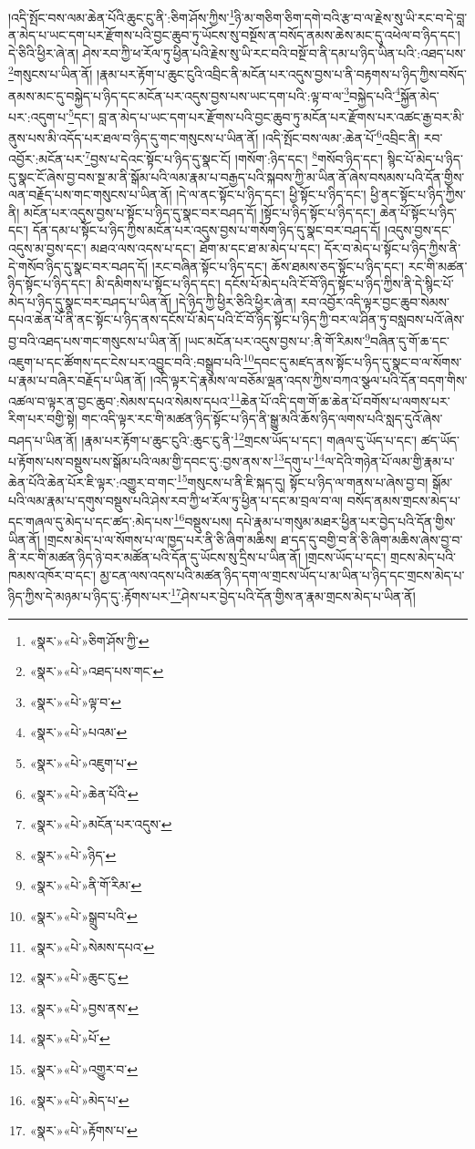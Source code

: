 །འདི་སྤོང་བས་ལམ་ཆེན་པོའི་ཆུང་ངུ་ནི་:ཅིག་ཤོས་ཀྱིས་\footnote{«སྣར་»«པེ་»ཅིག་ཤོས་ཀྱི་}ཉི་མ་གཅིག་ཅིག་དགེ་བའི་རྩ་བ་ལ་རྗེས་སུ་ཡི་རང་བ་དེ་བླ་ན་མེད་པ་ཡང་དག་པར་རྫོགས་པའི་བྱང་ཆུབ་ཏུ་ཡོངས་སུ་བསྔོས་ན་བསོད་ནམས་ཆེས་མང་དུ་འཕེལ་བ་ཉིད་དང་། དེ་ཅིའི་ཕྱིར་ཞེ་ན། ཤེས་རབ་ཀྱི་ཕ་རོལ་ཏུ་ཕྱིན་པའི་རྗེས་སུ་ཡི་རང་བའི་བསྔོ་བ་ནི་དམ་པ་ཉིད་ཡིན་པའི་:འཐད་པས་\footnote{«སྣར་»«པེ་»འཐད་པས་གང་}གསུངས་པ་ཡིན་ནོ། །རྣམ་པར་རྟོག་པ་ཆུང་ངུའི་འབྲིང་ནི་མངོན་པར་འདུས་བྱས་པ་ནི་བརྟགས་པ་ཉིད་ཀྱིས་བསོད་ནམས་མང་དུ་བསྐྱེད་པ་ཉིད་དང་མངོན་པར་འདུས་བྱས་པས་ཡང་དག་པའི་:ལྟ་བ་ལ་\footnote{«སྣར་»«པེ་»ལྟ་བ་}བསྐྱེད་པའི་\footnote{«སྣར་»«པེ་»པའམ་}སྐྱོན་མེད་པར་:འདུག་པ་\footnote{«སྣར་»«པེ་»འཇུག་པ་}དང་། བླ་ན་མེད་པ་ཡང་དག་པར་རྫོགས་པའི་བྱང་ཆུབ་ཏུ་མངོན་པར་རྫོགས་པར་འཚང་རྒྱ་བར་མི་ནུས་པས་མི་འདོད་པར་ཐལ་བ་ཉིད་དུ་གང་གསུངས་པ་ཡིན་ནོ། །འདི་སྤོང་བས་ལམ་:ཆེན་པོ་\footnote{«སྣར་»«པེ་»ཆེན་པོའི་}འབྲིང་ནི། རབ་འབྱོར་:མངོན་པར་\footnote{«སྣར་»«པེ་»མངོན་པར་འདུས་}བྱས་པ་དེའང་སྟོང་པ་ཉིད་དུ་སྣང་ངོ། །གསོག་:ཉིད་དང་། \footnote{«སྣར་»«པེ་»ཉིད་}གསོབ་ཉིད་དང་། སྙིང་པོ་མེད་པ་ཉིད་དུ་སྣང་ངོ་ཞེས་བྱ་བས་སྔ་མ་ནི་སྒོམ་པའི་ལམ་རྣམ་པ་བརྒྱད་པའི་སྐབས་ཀྱི་མ་ཡིན་ནོ་ཞེས་བསམས་པའི་དོན་གྱིས་ལན་བརྗོད་པས་གང་གསུངས་པ་ཡིན་ནོ། །དེ་ལ་ནང་སྟོང་པ་ཉིད་དང་། ཕྱི་སྟོང་པ་ཉིད་དང་། ཕྱི་ནང་སྟོང་པ་ཉིད་ཀྱིས་ནི། མངོན་པར་འདུས་བྱས་པ་སྟོང་པ་ཉིད་དུ་སྣང་བར་བཤད་དོ། །སྟོང་པ་ཉིད་སྟོང་པ་ཉིད་དང་། ཆེན་པོ་སྟོང་པ་ཉིད་དང་། དོན་དམ་པ་སྟོང་པ་ཉིད་ཀྱིས་མངོན་པར་འདུས་བྱས་པ་གསོག་ཉིད་དུ་སྣང་བར་བཤད་དོ། །འདུས་བྱས་དང་འདུས་མ་བྱས་དང་། མཐའ་ལས་འདས་པ་དང་། ཐོག་མ་དང་ཐ་མ་མེད་པ་དང་། དོར་བ་མེད་པ་སྟོང་པ་ཉིད་ཀྱིས་ནི་དེ་གསོབ་ཉིད་དུ་སྣང་བར་བཤད་དོ། །རང་བཞིན་སྟོང་པ་ཉིད་དང་། ཆོས་ཐམས་ཅད་སྟོང་པ་ཉིད་དང་། རང་གི་མཚན་ཉིད་སྟོང་པ་ཉིད་དང་། མི་དམིགས་པ་སྟོང་པ་ཉིད་དང་། དངོས་པོ་མེད་པའི་ངོ་བོ་ཉིད་སྟོང་པ་ཉིད་ཀྱིས་ནི་དེ་སྙིང་པོ་མེད་པ་ཉིད་དུ་སྣང་བར་བཤད་པ་ཡིན་ནོ། །དེ་ཉིད་ཀྱི་ཕྱིར་ཅིའི་ཕྱིར་ཞེ་ན། རབ་འབྱོར་འདི་ལྟར་བྱང་ཆུབ་སེམས་དཔའ་ཆེན་པོ་ནི་ནང་སྟོང་པ་ཉིད་ནས་དངོས་པོ་མེད་པའི་ངོ་བོ་ཉིད་སྟོང་པ་ཉིད་ཀྱི་བར་ལ་ཤིན་ཏུ་བསླབས་པའོ་ཞེས་བྱ་བའི་འཐད་པས་གང་གསུངས་པ་ཡིན་ནོ། །ཡང་མངོན་པར་འདུས་བྱས་པ་:ནི་གོ་རིམས་\footnote{«སྣར་»«པེ་»ནི་གོ་རིམ་}བཞིན་དུ་གོ་ཆ་དང་འཇུག་པ་དང་ཚོགས་དང་ངེས་པར་འབྱུང་བའི་:བསྒྲུབ་པའི་\footnote{«སྣར་»«པེ་»སྒྲུབ་པའི་}དབང་དུ་མཛད་ནས་སྟོང་པ་ཉིད་དུ་སྣང་བ་ལ་སོགས་པ་རྣམ་པ་བཞིར་བརྗོད་པ་ཡིན་ནོ། །འདི་ལྟར་དེ་རྣམས་ལ་བཅོམ་ལྡན་འདས་ཀྱིས་བཀའ་སྩལ་པའི་དོན་བདག་གིས་འཚལ་བ་ལྟར་ན་བྱང་ཆུབ་:སེམས་དཔའ་སེམས་དཔའ་\footnote{«སྣར་»«པེ་»སེམས་དཔའ་}ཆེན་པོ་འདི་དག་གོ་ཆ་ཆེན་པོ་བགོས་པ་ལགས་པར་རིག་པར་བགྱི་སྟེ། གང་འདི་ལྟར་རང་གི་མཚན་ཉིད་སྟོང་པ་ཉིད་ནི་སྒྱུ་མའི་ཆོས་ཉིད་ལགས་པའི་སླད་དུའོ་ཞེས་བཤད་པ་ཡིན་ནོ། །རྣམ་པར་རྟོག་པ་ཆུང་ངུའི་:ཆུང་ངུ་ནི་\footnote{«སྣར་»«པེ་»ཆུང་ངུ་}གྲངས་ཡོད་པ་དང་། གཞལ་དུ་ཡོད་པ་དང་། ཚད་ཡོད་པ་རྟོགས་པས་བསྡུས་པས་སྒོམ་པའི་ལམ་གྱི་དབང་དུ་:བྱས་ནས་ས་\footnote{«སྣར་»«པེ་»བྱས་ནས་}དགུ་པ་\footnote{«སྣར་»«པེ་»པོ་}ལ་དེའི་གཉེན་པོ་ལམ་གྱི་རྣམ་པ་ཆེན་པོའི་ཆེན་པོར་ཇི་ལྟར་:འགྱུར་བ་གང་\footnote{«སྣར་»«པེ་»འགྱུར་བ་}གསུངས་པ་ནི་ཇི་སྐད་དུ། སྟོང་པ་ཉིད་ལ་གནས་པ་ཞེས་བྱ་བ། སྒོམ་པའི་ལམ་རྣམ་པ་དགུས་བསྡུས་པའི་ཤེས་རབ་ཀྱི་ཕ་རོལ་ཏུ་ཕྱིན་པ་དང་མ་བྲལ་བ་ལ། བསོད་ནམས་གྲངས་མེད་པ་དང་གཞལ་དུ་མེད་པ་དང་ཚད་:མེད་པས་\footnote{«སྣར་»«པེ་»མེད་པ་}བསྡུས་པས། དཔེ་རྣམ་པ་གསུམ་མཐར་ཕྱིན་པར་བྱེད་པའི་དོན་གྱིས་ཡིན་ནོ། །གྲངས་མེད་པ་ལ་སོགས་པ་ལ་ཁྱད་པར་ནི་ཅི་ཞིག་མཆིས། ཐ་དད་དུ་བགྱི་བ་ནི་ཅི་ཞིག་མཆིས་ཞེས་བྱ་བ་ནི་རང་གི་མཚན་ཉིད་ཉེ་བར་མཚོན་པའི་དོན་དུ་ཡོངས་སུ་དྲིས་པ་ཡིན་ནོ། །གྲངས་ཡོད་པ་དང་། གྲངས་མེད་པའི་ཁམས་འཁོར་བ་དང་། མྱ་ངན་ལས་འདས་པའི་མཚན་ཉིད་དག་ལ་གྲངས་ཡོད་པ་མ་ཡིན་པ་ཉིད་དང་གྲངས་མེད་པ་ཉིད་ཀྱིས་དེ་མཉམ་པ་ཉིད་དུ་:རྟོགས་པར་\footnote{«སྣར་»«པེ་»རྟོགས་པ་}ཤེས་པར་བྱེད་པའི་དོན་གྱིས་ན་རྣམ་གྲངས་མེད་པ་ཡིན་ནོ། 